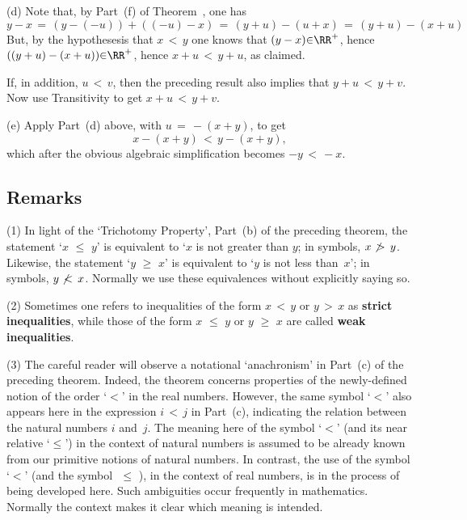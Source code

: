 \V

        (d) Note that, by Part~(f) of Theorem~, one has
        \begin{displaymath}
        y-x \,=\, (y-(-u)) + ((-u)-x) \,=\, (y+u) - (u+x) \,=\, (y+u) - (x+u)
        \end{displaymath}
    But, by the hypothesesis that $x\,<\,y$ one knows that $(y-x){\in}{\RR}^{+}$, hence $((y+u)-(x+u)){\in}{\RR}^{+}$, hence $x+u\,<\,y+u$, as claimed.

        If, in addition, $u\,<\,v$, then the preceding result also implies that $y+u\,<\,y+v$.
    Now use Transitivity to get $x+u\,<\,y+v$.

\V

        (e) Apply Part~(d) above, with $u \,=\, -(x+y)$, to get
        \begin{displaymath}
        x-(x+y) \,<\,y-(x+y),
        \end{displaymath}
    which after the obvious algebraic simplification becomes $-y\,<\,-x$.

\V

            \subsection{\small{\bf Remarks}}
            \label{RemrkB20.35}

\V

\hspace*{\parindent} (1) In light of the `Trichotomy Property', Part~(b) of the preceding theorem,
    the statement `$x\,\,{\leq}\,\,y$' is equivalent to `$x$ is not greater than $y$; in symbols, $x \not \,>\,y$.
    Likewise, the statement `$y\,\,{\geq}\,\,x$' is equivalent to `$y$ is not less than~$x$'; in symbols, $y \not \,<\,x$.
    Normally we use these equivalences without explicitly saying so.

\V

        (2) Sometimes one refers to inequalities of the form $x\,<\,y$ or $y\,>\,x$ as {\bf strict inequalities},
    while those of the form $x\,\,{\leq}\,\,y$ or $y\,\,{\geq}\,\,x$ are called {\bf weak inequalities}.

\V

        (3) The careful reader will observe a notational `anachronism' in Part~(c) of the preceding theorem.
    Indeed, the theorem concerns properties of the newly-defined notion of the order `$<$' in the real numbers.
    However, the same symbol `$<$' also appears here in the expression $i\,<\,j$ in Part~(c), indicating the relation between the natural numbers $i$ and~$j$.
    The meaning here of the symbol `$<$' (and its near relative `${\leq}$') in the context of
    natural numbers is assumed to be already known from our primitive notions of natural numbers.
    In contrast, the use of the symbol `$<$' (and the symbol $\,\,{\leq}\,\,$), in the context of real numbers, is in the process of being developed here.
    Such ambiguities occur frequently in mathematics. Normally the context makes it clear which meaning is intended.

